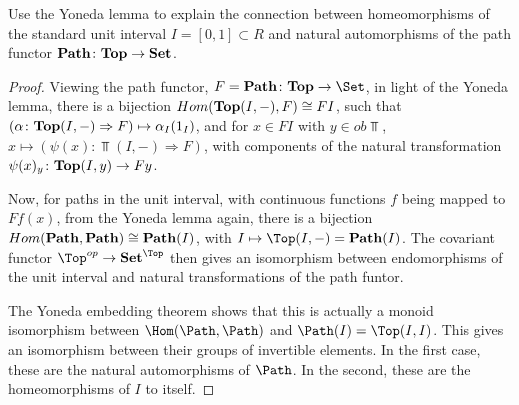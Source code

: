 \documentclass[../../main]{subfiles}
\begin{document}
\begin{exercise}
	Use the Yoneda lemma to explain the connection between homeomorphisms of the
	standard unit interval $I = [0,1] \subset R$ and natural automorphisms of the
	path functor $\bold {Path} \colon\bold {Top} \rightarrow \bold {Set}$.
\end{exercise}

\begin{proof}
	Viewing the path functor, $F = \bold {Path}\colon\bold{Top} \rightarrow
	\Set$, in light of the Yoneda lemma, there is a bijection $Hom(
	\bold{Top} (I,-),F) \cong FI$, such that $(\alpha \colon\bold{Top} (I,-)
	\Rightarrow F) \mapsto \alpha_I (1_I)$, and for $x \in FI$ with $y \in ob
	\Top$, $x \mapsto (\psi (x) \colon\Top(I,-) \Rightarrow F)$, with
	components of the natural transformation $\psi(x)_y \colon\bold{Top} (I,y)
	\rightarrow Fy$.

	Now, for paths in the unit interval, with continuous functions $f$ being mapped
	to $Ff(x)$, from the Yoneda lemma again, there is a bijection $Hom(\bold{Path},
	\bold{Path}) \cong \bold{Path} (I)$, with $I \mapsto \Top(I,-) =
	\bold{Path} (I)$. The covariant functor $\Top^{op} \rightarrow
	\bold{Set}^{\Top}$ then gives an isomorphism between endomorphisms of the
	unit interval and natural transformations of the path funtor.

	The Yoneda embedding theorem shows that this is actually a monoid isomorphism
	between $\Hom(\Path,\Path)$ and $\Path(I)=\Top(I,I)$. This gives an isomorphism
	between their groups of invertible elements. In the first case, these are the
	natural automorphisms of $\Path$. In the second, these are the homeomorphisms of
	$I$ to itself.


\end{proof}
\end{document}
